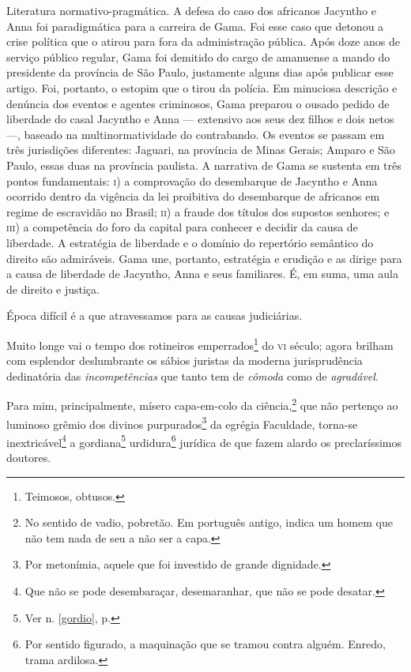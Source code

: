 \begin{didascalia}
Literatura normativo-pragmática. A defesa do caso dos africanos Jacyntho
e Anna foi paradigmática para a carreira de Gama. Foi esse caso que
detonou a crise política que o atirou para fora da administração
pública. Após doze anos de serviço público regular, Gama foi demitido do
cargo de amanuense a mando do presidente da província de São Paulo,
justamente alguns dias após publicar esse artigo. Foi, portanto, o
estopim que o tirou da polícia. Em minuciosa descrição e denúncia dos
eventos e agentes criminosos, Gama preparou o ousado pedido de liberdade
do casal Jacyntho e Anna --- extensivo aos seus dez filhos e dois netos
---, baseado na multinormatividade do contrabando. Os eventos se passam
em três jurisdições diferentes: Jaguari, na província de Minas Gerais;
Amparo e São Paulo, essas duas na província paulista. A narrativa de
Gama se sustenta em três pontos fundamentais: \textsc{i}) a comprovação do
desembarque de Jacyntho e Anna ocorrido dentro da vigência da lei
proibitiva do desembarque de africanos em regime de escravidão no
Brasil; \textsc{ii}) a fraude dos títulos dos supostos senhores; e \textsc{iii}) a
competência do foro da capital para conhecer e decidir da causa de
liberdade. A estratégia de liberdade e o domínio do repertório semântico
do direito são admiráveis. Gama une, portanto, estratégia e erudição e
as dirige para a causa de liberdade de Jacyntho, Anna e seus familiares.
É, em suma, uma aula de direito e justiça.
\end{didascalia}



Época difícil é a que atravessamos para as causas judiciárias.

Muito longe vai o tempo dos rotineiros emperrados\footnote{Teimosos,
  obtusos.} do \textsc{vi} século; agora brilham com esplendor deslumbrante os
sábios juristas da moderna jurisprudência dedinatória das
\emph{incompetências} que tanto tem de \emph{cômoda} como de
\emph{agradável}.

Para mim, principalmente, mísero capa-em-colo da ciência,\footnote{No
  sentido de vadio, pobretão. Em português antigo, indica um homem que
  não tem nada de seu a não ser a capa.} que não pertenço ao luminoso
grêmio dos divinos purpurados\footnote{Por metonímia, aquele que foi
  investido de grande dignidade.} da egrégia Faculdade, torna-se
inextricável\footnote{Que não se pode desembaraçar, desemaranhar, que
  não se pode desatar.} a gordiana\footnote{Ver n. \ref{gordio}, p. \pageref{gordio}}
urdidura\footnote{Por sentido figurado, a maquinação que se tramou
  contra alguém. Enredo, trama ardilosa.} jurídica de que fazem alardo
os preclaríssimos doutores.

